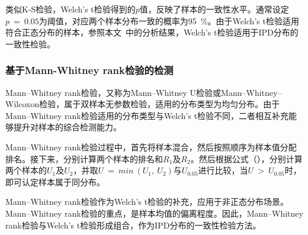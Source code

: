 类似K-S检验，Welch's t检验得到的$p$值，反映了样本的一致性水平。通常设定$p\ =\ 0.05$为阈值，对应两个样本分布一致的概率为95\ \%。由于Welch's t检验适用符合正态分布的样本，参照本文\ 中的分析结果，Welch's t检验适用于IPD分布的一致性检验。

\subsubsection{基于Mann-Whitney rank检验的检测}
\label{chap:analyze:statistical:test:mw}

Mann–Whitney rank检验，又称为Mann–Whitney U检验或Mann–Whitney–Wilcoxon检验，属于双样本无参数检验，适用的分布类型为均匀分布。由于Mann–Whitney rank检验适用的分布类型与Welch's t检验不同，二者相互补充能够提升对样本的综合检测能力。

Mann–Whitney rank检验过程中，首先将样本混合，然后按照顺序为样本值分配排名。接下来，分别计算两个样本的排名和$R_{1}$及$R_{2}$。然后根据公式（），分别计算两个样本的$U_{1}$及$U_{2}$，并取$U\ =\ min\ (U_{1},\ U_{2})$与$U_{0.05}$进行比较，当$U\ >\ U_{0.05}$时，即可认定样本属于同分布。

Mann–Whitney rank检验作为Welch's t检验的补充，应用于非正态分布场景。Mann–Whitney rank检验的重点，是样本均值的偏离程度。因此，Mann–Whitney rank检验与Welch's t检验形成组合，作为IPD分布的一致性检验方法。


